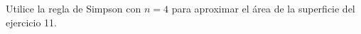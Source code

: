 \item Utilice la regla de Simpson con $n = 4$ para aproximar el área de la superficie del ejercicio 11.
